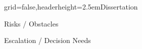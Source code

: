 \documentclass[english]{kiesgrube}
\begin{document}
\begin{poster}{grid=false,headerheight=2.5em}{}{Dissertation}{}{}
\begin{posterbox}[name=risks,column=1,below=description]{Risks / Obstacles}
\end{posterbox}
\begin{posterbox}[name=escalation,column=1,below=risks]{Escalation / Decision Needs}
\end{posterbox}
\footer{}
\end{poster}

\newpage
\end{document}
